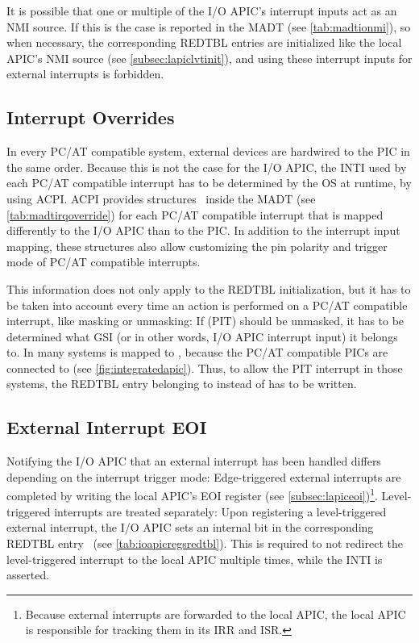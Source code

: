 It is possible that one or multiple of the I/O APIC's interrupt inputs act as an NMI source.
If this is the case is reported in the MADT (see \autoref{tab:madtionmi}), so when necessary, the corresponding REDTBL entries are initialized like the local APIC's NMI source (see \autoref{subsec:lapiclvtinit}), and using these interrupt inputs for external interrupts is forbidden.

\subsection{Interrupt Overrides}
\label{subsec:ioapicpcat}

In every PC/AT compatible system, external devices are hardwired to the PIC in the same order.
Because this is not the case for the I/O APIC, the INTI used by each PC/AT compatible interrupt has to be determined by the OS at runtime, by using ACPI\@.
ACPI provides  structures~\autocite[sec.~5.2.8.3.1]{acpi1} inside the MADT (see \autoref{tab:madtirqoverride}) for each PC/AT compatible interrupt that is mapped differently to the I/O APIC than to the PIC\@.
In addition to the interrupt input mapping, these structures also allow customizing the pin polarity and trigger mode of PC/AT compatible interrupts.

This information does not only apply to the REDTBL initialization, but it has to be taken into account every time an action is performed on a PC/AT compatible interrupt, like masking or unmasking: If  (PIT) should be unmasked, it has to be determined what GSI (or in other words, I/O APIC interrupt input) it belongs to.
In many systems  is mapped to , because the PC/AT compatible PICs are connected to  (see \autoref{fig:integratedapic}).
Thus, to allow the PIT interrupt in those systems, the REDTBL entry belonging to  instead of  has to be written.

\subsection{External Interrupt EOI}
\label{subsec:ioapiceoi}

Notifying the I/O APIC that an external interrupt has been handled differs depending on the interrupt trigger mode: Edge-triggered external interrupts are completed by writing the local APIC's EOI register (see \autoref{subsec:lapiceoi})\footnote{
  Because external interrupts are forwarded to the local APIC, the local APIC is responsible for tracking them in its IRR and ISR.}.
Level-triggered interrupts are treated separately: Upon registering a level-triggered external interrupt, the I/O APIC sets an internal  bit in the corresponding REDTBL entry~\autocite[sec.~9.5.8]{ich5} (see \autoref{tab:ioapicregsredtbl}).
This is required to not redirect the level-triggered interrupt to the local APIC multiple times, while the INTI is asserted.

